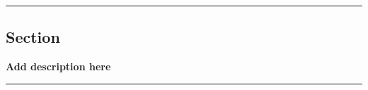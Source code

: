 {\color{gray}\hrule}
\begin{center}
\section{Section}
\textbf{Add description here}
\bigskip
\end{center}
{\color{gray}\hrule}
\begin{multicols}{2}
\lipsum
\end{multicols}
